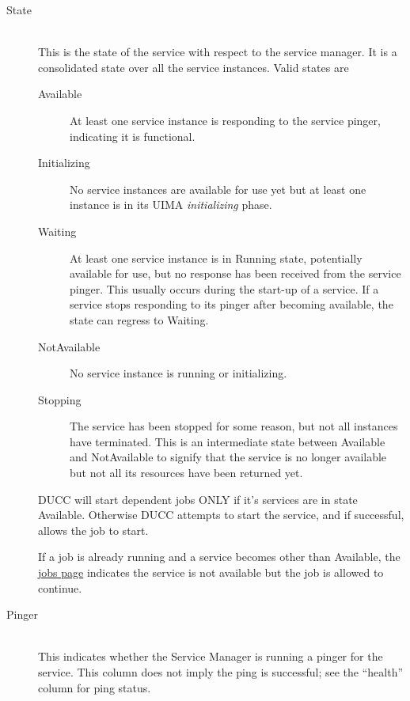 \begin{description}
            \item[State] \hfill \\
              This is the state of the service with respect to the service manager.  It is a
              consolidated state over all the service instances.  Valid states are
              \begin{description}
                \item[Available] At least one service instance is responding to the service
                  pinger, indicating it is functional.
                \item[Initializing] No service instances are available for use yet but at least one instance
                  is in its UIMA {\em initializing} phase.
                \item[Waiting] At least one service instance is in Running state, potentially available for use,
                  but no response has been received from the service pinger.  This usually occurs during the
                  start-up of a service.  If a service stops responding to its pinger after becoming
                  available, the state can regress to Waiting.
                \item[NotAvailable] No service instance is running or initializing. 
                \item[Stopping] The service has been stopped for some reason, but not all 
                  instances have terminated.  This is an intermediate state between Available and
                  NotAvailable to signify that the service is no longer available but not all its
                  resources have been returned yet.
              \end{description}

              DUCC will start dependent jobs ONLY if it's services are in state Available.  Otherwise
              DUCC attempts to start the service, and if successful, allows the job to start.  

              If a job is already running and a service becomes other than Available, the
              \hyperref[sec:ws.jobs-page]{jobs page} indicates the service is not available but the job is 
              allowed to continue.
              
            \item[Pinger] \hfill \\
              This indicates whether the Service Manager is running a pinger for the service.  This column
              does not imply the ping is successful; see the ``health'' column for ping status.
              

\end{description}

